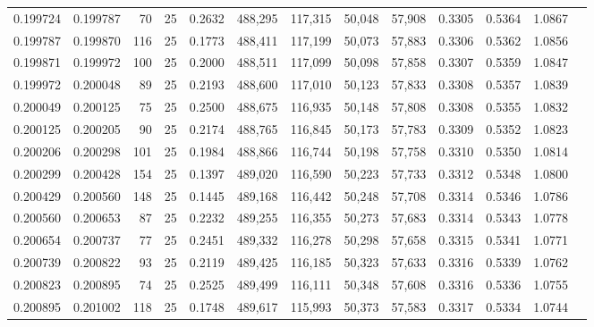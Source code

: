 \begin{tabular}{rrrrrrrrrrrrr}
0.199724 & 0.199787 &    70 &  25 &                                     0.2632 & 488,295 & 117,315 &  50,048 &  57,908 & 0.3305 & 0.5364 & 1.0867 \\
0.199787 & 0.199870 &   116 &  25 &                                     0.1773 & 488,411 & 117,199 &  50,073 &  57,883 & 0.3306 & 0.5362 & 1.0856 \\
0.199871 & 0.199972 &   100 &  25 &                                     0.2000 & 488,511 & 117,099 &  50,098 &  57,858 & 0.3307 & 0.5359 & 1.0847 \\
0.199972 & 0.200048 &    89 &  25 &                                     0.2193 & 488,600 & 117,010 &  50,123 &  57,833 & 0.3308 & 0.5357 & 1.0839 \\
0.200049 & 0.200125 &    75 &  25 &                                     0.2500 & 488,675 & 116,935 &  50,148 &  57,808 & 0.3308 & 0.5355 & 1.0832 \\
0.200125 & 0.200205 &    90 &  25 &                                     0.2174 & 488,765 & 116,845 &  50,173 &  57,783 & 0.3309 & 0.5352 & 1.0823 \\
0.200206 & 0.200298 &   101 &  25 &                                     0.1984 & 488,866 & 116,744 &  50,198 &  57,758 & 0.3310 & 0.5350 & 1.0814 \\
0.200299 & 0.200428 &   154 &  25 &                                     0.1397 & 489,020 & 116,590 &  50,223 &  57,733 & 0.3312 & 0.5348 & 1.0800 \\
0.200429 & 0.200560 &   148 &  25 &                                     0.1445 & 489,168 & 116,442 &  50,248 &  57,708 & 0.3314 & 0.5346 & 1.0786 \\
0.200560 & 0.200653 &    87 &  25 &                                     0.2232 & 489,255 & 116,355 &  50,273 &  57,683 & 0.3314 & 0.5343 & 1.0778 \\
0.200654 & 0.200737 &    77 &  25 &                                     0.2451 & 489,332 & 116,278 &  50,298 &  57,658 & 0.3315 & 0.5341 & 1.0771 \\
0.200739 & 0.200822 &    93 &  25 &                                     0.2119 & 489,425 & 116,185 &  50,323 &  57,633 & 0.3316 & 0.5339 & 1.0762 \\
0.200823 & 0.200895 &    74 &  25 &                                     0.2525 & 489,499 & 116,111 &  50,348 &  57,608 & 0.3316 & 0.5336 & 1.0755 \\
0.200895 & 0.201002 &   118 &  25 &                                     0.1748 & 489,617 & 115,993 &  50,373 &  57,583 & 0.3317 & 0.5334 & 1.0744 \\

\end{tabular}
